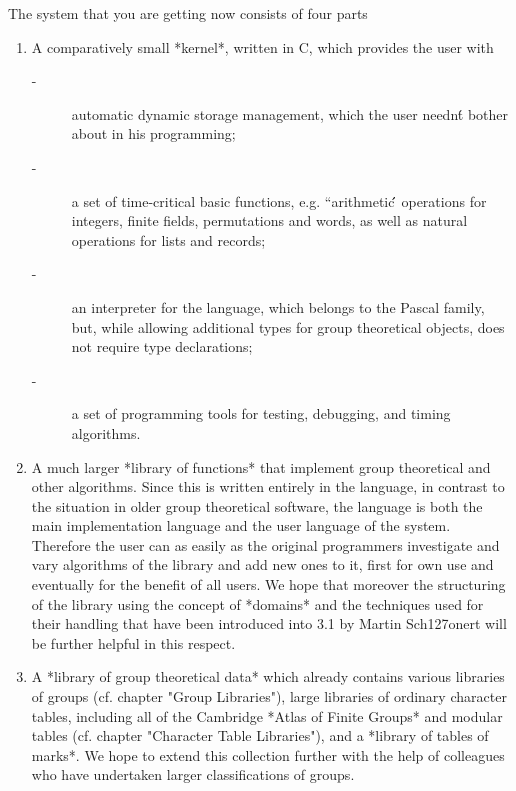 The system that you are getting now consists of four parts{\:}
\begin{enumerate}
\item

A comparatively  small *kernel*, written  in C,  which provides  the user
with{\:}

\begin{description}
\item[-] automatic dynamic storage management, which the user needn\'t
         bother about in his programming;
\item[-] a set of time-critical basic functions, e.g.  ``arithmetic\'\'\,
         operations for integers, finite fields, permutations and words,
         as well as natural operations for lists and records;
\item[-] an interpreter for the {\GAP} language, which belongs  to  the 
         Pascal family, but, while allowing additional types  for  group
         theoretical objects, does not require type declarations;
\item[-] a set  of  programming  tools  for  testing,  debugging,  and 
         timing algorithms.
\end{description}

\item 

A  much  larger  *library  of  {\GAP}  functions*  that  implement  group
theoretical and other algorithms.  Since this is  written entirely in the
{\GAP}  language, in contrast to the situation in older group theoretical
software,  the  {\GAP} language is both  the main implementation language
and the user language of the system.  Therefore the user can as easily as
the original programmers  investigate and vary algorithms of  the library
and add new ones to it, first for  own use and eventually for the benefit
of all {\GAP}  users.   We hope that  moreover  the  structuring  of  the
library using the concept of *domains* and  the techniques used for their
handling  that  have  been   introduced   into  {\GAP}   3.1  by   Martin
Sch{\accent127o}nert will be further helpful in this respect.

\item

A  *library of  group theoretical data*   which already  contains various
libraries  of groups (cf. chapter  "Group Libraries"), large libraries of
ordinary character  tables,  including all  of  the  Cambridge *Atlas  of
Finite  Groups*    and  modular tables   (cf.   chapter "Character  Table
Libraries"), and a  *library of tables of  marks*. We hope to extend this
collection further with the help of colleagues who have undertaken larger
classifications of groups.


\end{enumerate}
